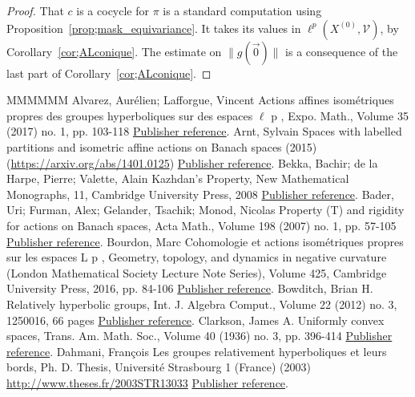 \documentclass[11pt]{article}
\theoremstyle{definition}
\numberwithin{equation}{section}
\begin{document}
\begin{proof}
That $c$ is a cocycle for $\pi$ is a standard computation using Proposition~\ref{prop;mask_equivariance}. It takes its values in $\ell^p(X^{(0)},\mathscr{V})$, by Corollary~\ref{cor;ALconique}. The estimate on $\|g(\vec{0})\|$ is a consequence of the last part of Corollary~\ref{cor;ALconique}.
\end{proof}
\begin{thebibliography}{MMMMMM}
 Alvarez, Aurélien; Lafforgue, Vincent Actions affines isométriques propres des groupes hyperboliques sur des espaces \(\ell\) p , Expo. Math., Volume 35 (2017) no. 1, pp. 103-118 \href{https://ahl.centre-mersenne.org/item/AHL_2020__3__35_0/#AL}{Publisher reference}.
 Arnt, Sylvain Spaces with labelled partitions and isometric affine actions on Banach spaces (2015) (\url{https://arxiv.org/abs/1401.0125}) \href{https://ahl.centre-mersenne.org/item/AHL_2020__3__35_0/#Ar}{Publisher reference}.
 Bekka, Bachir; de la Harpe, Pierre; Valette, Alain Kazhdan’s Property, New Mathematical Monographs, 11, Cambridge University Press, 2008 \href{https://ahl.centre-mersenne.org/item/AHL_2020__3__35_0/#BdlHV}{Publisher reference}.
 Bader, Uri; Furman, Alex; Gelander, Tsachik; Monod, Nicolas Property (T) and rigidity for actions on Banach spaces, Acta Math., Volume 198 (2007) no. 1, pp. 57-105 \href{https://ahl.centre-mersenne.org/item/AHL_2020__3__35_0/#BFGM}{Publisher reference}.
 Bourdon, Marc Cohomologie et actions isométriques propres sur les espaces L p , Geometry, topology, and dynamics in negative curvature (London Mathematical Society Lecture Note Series), Volume 425, Cambridge University Press, 2016, pp. 84-106 \href{https://ahl.centre-mersenne.org/item/AHL_2020__3__35_0/#Bou}{Publisher reference}.
 Bowditch, Brian H. Relatively hyperbolic groups, Int. J. Algebra Comput., Volume 22 (2012) no. 3, 1250016, 66 pages \href{https://ahl.centre-mersenne.org/item/AHL_2020__3__35_0/#BowRH}{Publisher reference}.
 Clarkson, James A. Uniformly convex spaces, Trans. Am. Math. Soc., Volume 40 (1936) no. 3, pp. 396-414 \href{https://ahl.centre-mersenne.org/item/AHL_2020__3__35_0/#Cla}{Publisher reference}.
 Dahmani, François Les groupes relativement hyperboliques et leurs bords, Ph. D. Thesis, Université Strasbourg 1 (France) (2003) \url{http://www.theses.fr/2003STR13033} \href{https://ahl.centre-mersenne.org/item/AHL_2020__3__35_0/#Dthesis}{Publisher reference}.

\end{thebibliography}
\end{document}
